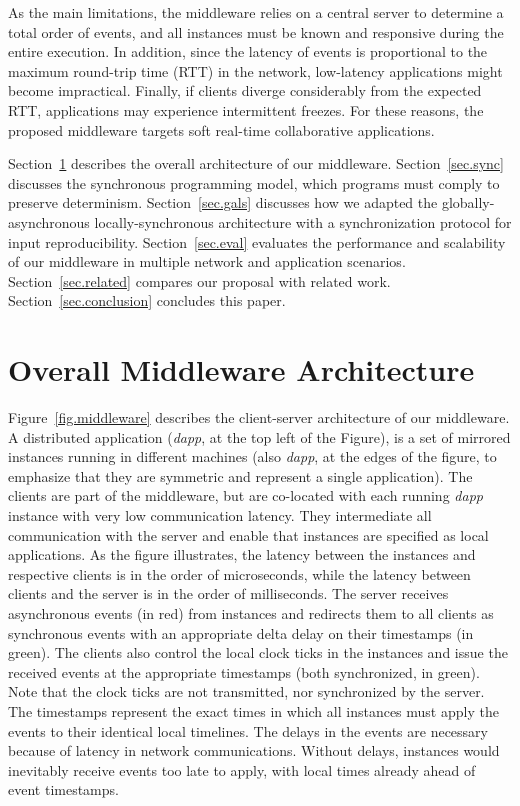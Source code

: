 \documentclass[sigplan,screen]{acmart}
\newcommand{\dapp}{\emph{dapp}\xspace}
\begin{document}
As the main limitations, the middleware relies on a central server to determine
a total order of events, and all instances must be known and responsive during
the entire execution.
In addition, since the latency of events is proportional to the maximum
round-trip time (RTT) in the network, low-latency applications might become
impractical.
Finally, if clients diverge considerably from the expected RTT, applications
may experience intermittent freezes.
For these reasons, the proposed middleware targets soft real-time collaborative
applications.

Section~\ref{sec.arch} describes the overall architecture of our middleware.
Section~\ref{sec.sync} discusses the synchronous programming model, which
programs must comply to preserve determinism.
Section~\ref{sec.gals} discusses how we adapted the globally-asynchronous
locally-synchronous architecture with a synchronization protocol for input
reproducibility.
Section~\ref{sec.eval} evaluates the performance and scalability of our
middleware in multiple network and application scenarios.
Section~\ref{sec.related} compares our proposal with related work.
Section~\ref{sec.conclusion} concludes this paper.

\section{Overall Middleware Architecture}
\label{sec.arch}

Figure~\ref{fig.middleware} describes the client-server architecture of our
middleware.
A distributed application (\dapp, at the top left of the Figure), is a set of
mirrored instances running in different machines (also \dapp, at the edges of
the figure, to emphasize that they are symmetric and represent a single
application).
The clients are part of the middleware, but are co-located with each running
\dapp instance with very low communication latency.
They intermediate all communication with the server and enable that instances
are specified as local applications.
As the figure illustrates, the latency between the instances and respective
clients is in the order of microseconds, while the latency between clients and
the server is in the order of milliseconds.
The server receives asynchronous events (in red) from instances and redirects
them to all clients as synchronous events with an appropriate delta delay on
their timestamps (in green).
The clients also control the local clock ticks in the instances and issue the
received events at the appropriate timestamps (both synchronized, in green).
Note that the clock ticks are not transmitted, nor synchronized by the server.
%
The timestamps represent the exact times in which all instances must apply the
events to their identical local timelines.
The delays in the events are necessary because of latency in network
communications.
Without delays, instances would inevitably receive events too late to apply,
with local times already ahead of event timestamps.
\end{document}
